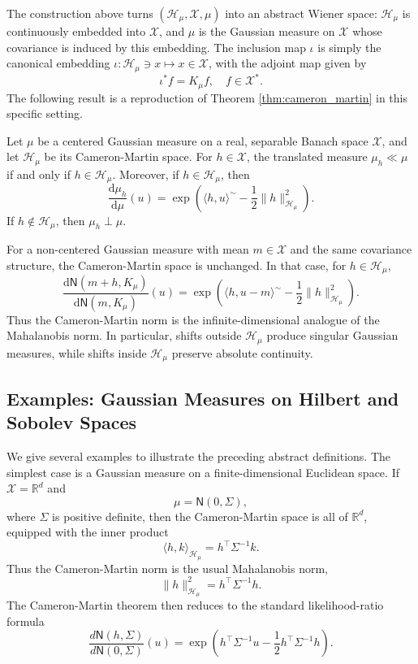 \documentclass[11pt]{article}
\renewcommand{\d}{\mathrm{d}}
\begin{document}
The construction above turns $(\mathcal H_\mu,\mathcal X,\mu)$ into an abstract Wiener space: $\mathcal H_\mu$ is continuously embedded into $\mathcal X$, and $\mu$ is the Gaussian measure on $\mathcal X$ whose covariance is induced by this embedding. The inclusion map $\iota$ is simply the canonical embedding $\iota:\mathcal{H}_\mu\ni x\mapsto x\in\mathcal{X}$, with the adjoint map given by $$\iota^* f=K_\mu f,\quad f\in\mathcal{X}^*.$$  The following result is a reproduction of Theorem \ref{thm:cameron_martin} in this specific setting.

\begin{theorem}
\label{thm:cameron_martin2}
Let $\mu$ be a centered Gaussian measure on a real, separable Banach space $\mathcal X$, and let $\mathcal H_\mu$ be its Cameron-Martin space. For $h\in\mathcal{X}$,
the translated measure $\mu_h\ll \mu$ if and only if $h\in\mathcal{H}_\mu$. Moreover, if $h\in\mathcal H_\mu$, then
\[
    \frac{\d\mu_h}{\d\mu}(u)=\exp\left(\langle h,u\rangle^\sim-\frac12\|h\|_{\mathcal H_\mu}^2\right).
\]
If $h\notin\mathcal H_\mu$, then $\mu_h\perp \mu$.
\end{theorem}

For a non-centered Gaussian measure with mean $m\in\mathcal X$ and the same covariance structure, the Cameron-Martin space is unchanged. In that case, for $h\in\mathcal H_\mu$,
\[
    \frac{\d\mathsf N(m+h,K_\mu)}{\d\mathsf N(m,K_\mu)}(u)
    =
    \exp\left(
        \langle h,u-m\rangle^\sim
        -
        \frac12\|h\|_{\mathcal H_\mu}^2
    \right).
\]
Thus the Cameron-Martin norm is the infinite-dimensional analogue of the Mahalanobis norm. In particular, shifts outside $\mathcal H_\mu$ produce singular Gaussian measures, while shifts inside $\mathcal H_\mu$ preserve absolute continuity.


\subsection{Examples: Gaussian Measures on Hilbert and Sobolev Spaces}
\label{app:gaussian_examples}

We give several examples to illustrate the preceding abstract definitions. The simplest case is a Gaussian measure on a finite-dimensional Euclidean space. If $\mathcal X=\mathbb R^d$ and
\[
    \mu=\mathsf N(0,\Sigma),
\]
where $\Sigma$ is positive definite, then the Cameron-Martin space is all of $\mathbb R^d$, equipped with the inner product
\[
    \langle h,k\rangle_{\mathcal H_\mu}
    =
    h^\top \Sigma^{-1}k.
\]
Thus the Cameron-Martin norm is the usual Mahalanobis norm,
\[
    \|h\|_{\mathcal H_\mu}^2
    =
    h^\top \Sigma^{-1}h.
\]
The Cameron-Martin theorem then reduces to the standard likelihood-ratio formula
\[
    \frac{d\mathsf N(h,\Sigma)}{d\mathsf N(0,\Sigma)}(u)
    =
    \exp\left(
        h^\top\Sigma^{-1}u
        -
        \frac12 h^\top\Sigma^{-1}h
    \right).
\]
\end{document}
